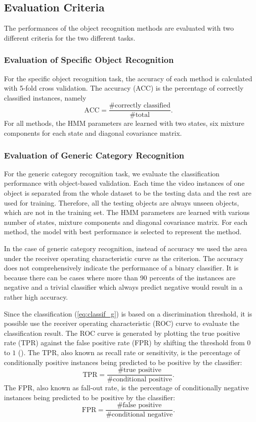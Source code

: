 \documentclass[letterpaper, 10 pt, conference]{ieeeconf}  %
\begin{document}
\subsection{Evaluation Criteria}
The performances of the object recognition methods are evaluated with two different criteria for the two different tasks. 
\subsubsection{Evaluation of Specific Object Recognition}
For the specific object recognition task, the accuracy of each method is calculated with 5-fold cross validation. The accuracy (ACC) is the percentage of correctly classified instances, namely 
\[ \text{ACC} =  \frac{\text{\# correctly classified}}{\text{\# total}} . \]
For all methods, the HMM parameters are learned with two states, six mixture components for each state and diagonal covariance matrix.

\subsubsection{Evaluation of Generic Category Recognition}
For the generic category recognition task, we evaluate the classification performance with object-based validation. Each time the video instances of one object is separated from the whole dataset to be the testing data and the rest are used for training. Therefore, all the testing objects are always unseen objects, which are not in the training set. The HMM parameters are learned with various number of states, mixture components and diagonal covariance matrix. For each method, the model with best performance is selected to represent the method.

In the case of generic category recognition, instead of accuracy we used the area under the receiver operating characteristic curve as the criterion. The accuracy does not comprehensively indicate the performance of a binary classifier. It is because there can be cases where more than 90 percents of the instances are negative and a trivial classifier which always predict negative would result in a rather high accuracy.

Since the classification (\cref{eq:classif_g}) is based on a discrimination threshold, it is possible use the receiver operating characteristic (ROC) curve to evaluate the classification result. The ROC curve is generated by plotting the true positive rate (TPR) against the false positive rate (FPR) by shifting the threshold from $0$ to $1$ (). The TPR, also known as recall rate or sensitivity, is the percentage of conditionally positive instances being predicted to be positive by the classifier:
\[ \text{TPR} =  \frac{\text{\# true positive}}{\text{\# conditional positive}} . \]
The FPR, also known as fall-out rate, is the percentage of conditionally negative instances being predicted to be positive by the classifier:
\[ \text{FPR} =  \frac{\text{\# false positive}}{\text{\# conditional negative}} . \]
\end{document}
